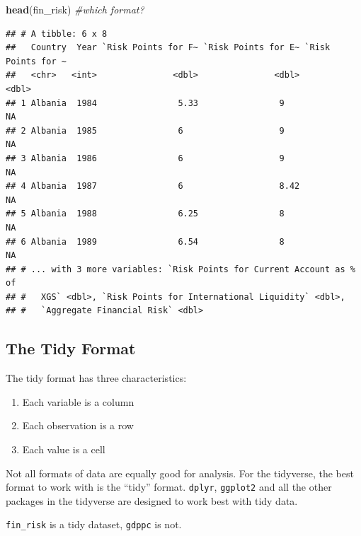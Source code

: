 \documentclass[11pt,]{article}
\newenvironment{Shaded}{\begin{snugshade}}{\end{snugshade}}
\newcommand{\KeywordTok}[1]{\textcolor[rgb]{0.13,0.29,0.53}{\textbf{#1}}}
\newcommand{\CommentTok}[1]{\textcolor[rgb]{0.56,0.35,0.01}{\textit{#1}}}
\newcommand{\NormalTok}[1]{#1}
\providecommand{\tightlist}{%
  \setlength{\itemsep}{0pt}\setlength{\parskip}{0pt}}
\begin{document}
\begin{Shaded}
\begin{Highlighting}[]
\KeywordTok{head}\NormalTok{(fin_risk) }\CommentTok{#which format?}
\end{Highlighting}
\end{Shaded}

\begin{verbatim}
## # A tibble: 6 x 8
##   Country  Year `Risk Points for F~ `Risk Points for E~ `Risk Points for ~
##   <chr>   <int>               <dbl>               <dbl>              <dbl>
## 1 Albania  1984                5.33                9                    NA
## 2 Albania  1985                6                   9                    NA
## 3 Albania  1986                6                   9                    NA
## 4 Albania  1987                6                   8.42                 NA
## 5 Albania  1988                6.25                8                    NA
## 6 Albania  1989                6.54                8                    NA
## # ... with 3 more variables: `Risk Points for Current Account as % of
## #   XGS` <dbl>, `Risk Points for International Liquidity` <dbl>,
## #   `Aggregate Financial Risk` <dbl>
\end{verbatim}

\subsection{The Tidy Format}\label{the-tidy-format}

The tidy format has three characteristics:

\begin{enumerate}
\def\labelenumi{\arabic{enumi}.}
\tightlist
\item
  Each variable is a column
\item
  Each observation is a row
\item
  Each value is a cell
\end{enumerate}

Not all formats of data are equally good for analysis. For the
tidyverse, the best format to work with is the ``tidy'' format.
\texttt{dplyr}, \texttt{ggplot2} and all the other packages in the
tidyverse are designed to work best with tidy data.

\texttt{fin\_risk} is a tidy dataset, \texttt{gdppc} is not.
\end{document}
